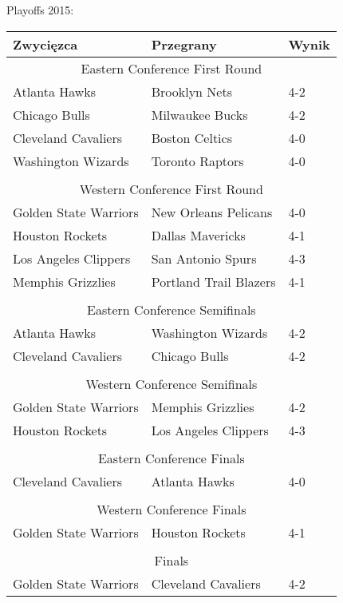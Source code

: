 \documentclass[inzynierska]{pwr_wmat_praca_dyplomowa}
\theoremstyle{plain}
\numberwithin{theorem}{chapter}
\theoremstyle{definition}
\numberwithin{theorem}{chapter}
\begin{document}
Playoffs 2015:
\begin{table}[]
	\begin{tabular}{ |p{5cm}|p{5cm}|p{5cm}|  }
		\hline
		\textbf{Zwycięzca}& \textbf{Przegrany} &\textbf{Wynik}\\\hline		
		\multicolumn{3}{|c|}{Eastern Conference First Round} \\\hline
		Atlanta Hawks& Brooklyn Nets &4-2\\\hline
		Chicago Bulls& Milwaukee Bucks&4-2\\\hline
		Cleveland Cavaliers& Boston Celtics &4-0\\\hline
		Washington Wizards& Toronto Raptors&4-0\\\hline
		\multicolumn{3}{|c|}{} \\\hline
		
		\multicolumn{3}{|c|}{Western Conference First Round} \\\hline
		Golden State Warriors &New Orleans Pelicans &4-0\\\hline
		Houston Rockets& Dallas Mavericks&4-1\\\hline
		Los Angeles Clippers& San Antonio Spurs &4-3\\\hline
		Memphis Grizzlies& Portland Trail Blazers&4-1\\\hline
		\multicolumn{3}{|c|}{} \\\hline

		\multicolumn{3}{|c|}{Eastern Conference Semifinals} \\\hline
		Atlanta Hawks& Washington Wizards &4-2\\\hline
		Cleveland Cavaliers& Chicago Bulls&4-2\\\hline
		\multicolumn{3}{|c|}{} \\\hline
		
		\multicolumn{3}{|c|}{Western Conference Semifinals} \\\hline
		Golden State Warriors& Memphis Grizzlies &4-2\\\hline
		Houston Rockets& Los Angeles Clippers&4-3\\\hline
		\multicolumn{3}{|c|}{} \\\hline
		
		\multicolumn{3}{|c|}{Eastern Conference Finals} \\\hline
		Cleveland Cavaliers& Atlanta Hawks&4-0\\\hline
		\multicolumn{3}{|c|}{} \\\hline
		
		\multicolumn{3}{|c|}{Western Conference Finals} \\\hline
		Golden State Warriors& Houston Rockets&4-1\\\hline
		\multicolumn{3}{|c|}{} \\\hline
		
		\multicolumn{3}{|c|}{Finals} \\\hline
		Golden State Warriors& Cleveland Cavaliers &4-2\\\hline
	\end{tabular}
\end{table}
\end{document}
